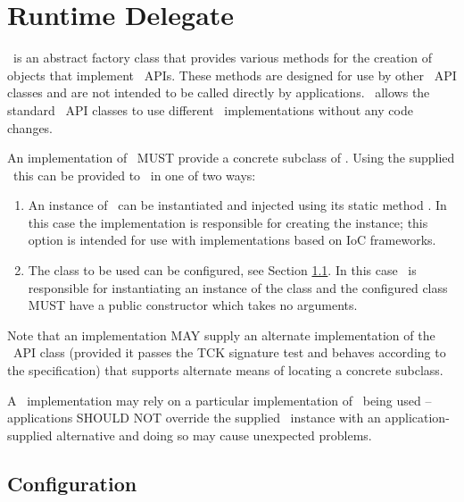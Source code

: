 \chapter{Runtime Delegate}
\label{runtimedelegate}

\rd\ is an abstract factory class that provides various methods for the creation of objects that implement \jaxrs\ APIs. These methods are designed for use by other \jaxrs\ API classes and are not intended to be called directly by applications. \rd\ allows the standard \jaxrs\ API classes to use different \jaxrs\ implementations without any code changes.

An implementation of \jaxrs\ MUST provide a concrete subclass of \rd. Using the supplied \rd\ this can be provided to \jaxrs\ in one of two ways:

\begin{enumerate}
\item An instance of \rd\ can be instantiated and injected using its static method . In this case the implementation is responsible for creating the instance; this option is intended for use with implementations based on IoC frameworks.
\item The class to be used can be configured, see Section \ref{rdconfig}. In this case \jaxrs\ is responsible for instantiating an instance of the class and the configured class MUST have a public constructor which takes no arguments.
\end{enumerate}

Note that an implementation MAY supply an alternate implementation of the \rd\ API class (provided it passes the TCK signature test and behaves according to the specification) that supports alternate means of locating a concrete subclass.

A \jaxrs\ implementation may rely on a particular implementation of \rd\ being used -- applications SHOULD NOT override the supplied \rd\ instance with an application-supplied alternative and doing so may cause unexpected problems. 

\section{Configuration}\label{rdconfig}

